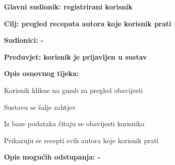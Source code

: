 					\noindent {}
					\begin{packed_item}
						\item \textbf{Glavni sudionik: registrirani korisnik}
						\item  \textbf{Cilj: pregled recepata autora koje korisnik prati}
						\item  \textbf{Sudionici: -}
						\item  \textbf{Preduvjet: korisnik je prijavljen u sustav}
						
						\item  \textbf{Opis osnovnog tijeka:}
						\item[] \begin{packed_enum}
							\item Korisnik klikne na gumb za pregled obavijesti
							\item Sustavu se šalje zahtjev
							\item Iz baze podataka čitaju se obavijesti korisnika
							\item Prikazuju se recepti svih autora koje korisnik prati
						\end{packed_enum}
						
						\item  \textbf{Opis mogućih odstupanja: -}
						\item[] \begin{packed_item}							
						\end{packed_item}
					\end{packed_item}
				
				
				
